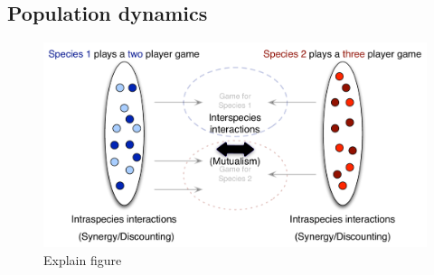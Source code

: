 \documentclass{pnastwo}
\begin{document}
\begin{article}
\subsection{Population dynamics}

\begin{figure}[h]
\begin{center}
\includegraphics[width=\columnwidth]{../Figures/interintra.pdf}
\caption{
Explain figure
}
\end{center}
\end{figure}


\end{article}
\end{document}
